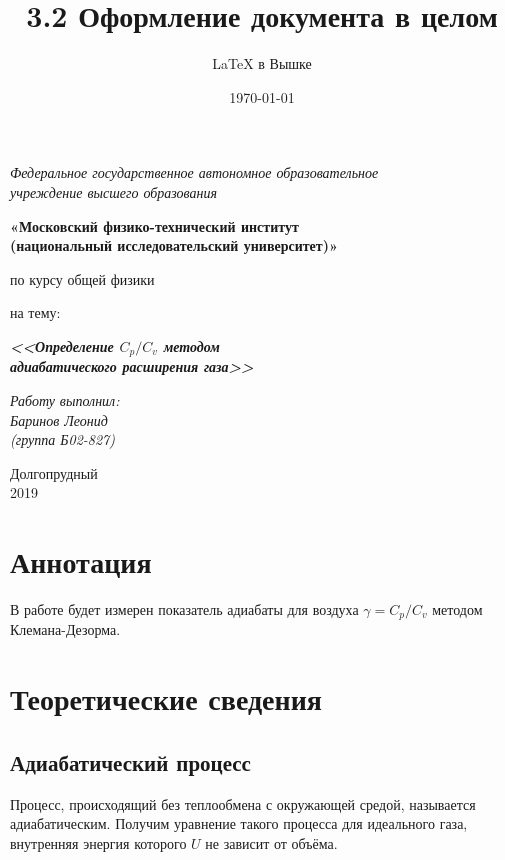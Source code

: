 \documentclass[a4paper,12pt]{article}
\author{\LaTeX{} в Вышке}
\title{3.2 Оформление документа в целом}
\date{\today}
\theoremstyle{plain} %
\theoremstyle{definition} %
\theoremstyle{remark} %
\begin{document}
	\thispagestyle{empty}
	\begin{center}
		\textit{Федеральное государственное автономное образовательное\\ учреждение высшего образования }
		\vspace{0.5ex}
		
		\textbf{«Московский физико-технический институт\\ (национальный исследовательский университет)»}
	\end{center}
	\vspace{10ex}
	\begin{center}
		\vspace{13ex}
		\vspace{1ex}
		
		по курсу общей физики
		
		
		на тему:
		
		\textbf{\textit{<<Определение $C_p/C_v$ методом \\ адиабатического расширения газа>>}}
		\vspace{30ex}
		\begin{flushright}
			\noindent
			\textit{Работу выполнил:}
			\\
			\textit{Баринов Леонид \\(группа Б02-827)}
		\end{flushright}
		\vfill
		Долгопрудный \\2019
	\end{center}
	\newpage
	\setcounter{page}{1}
	\section{Аннотация}
	В работе будет измерен показатель адиабаты  для воздуха $\gamma = C_p/C_v$ методом Клемана-Дезорма.
	\section {Теоретические сведения}
	\subsection{Адиабатический процесс}
	Процесс, происходящий без теплообмена с окружающей средой, называется адиабатическим. Получим уравнение такого процесса для идеального газа, внутренняя энергия которого $U$ не зависит от объёма.
	
\end{document}
